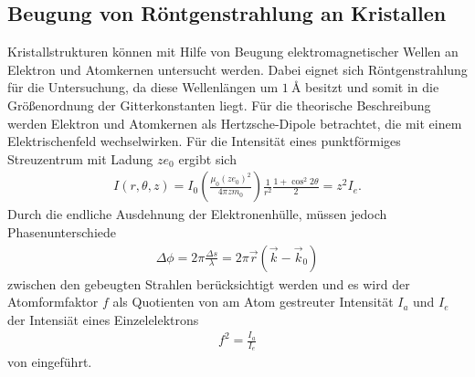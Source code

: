 \subsection{Beugung von Röntgenstrahlung an Kristallen}
\label{subsec:Beugung}
Kristallstrukturen können mit Hilfe von Beugung
elektromagnetischer Wellen an Elektron und Atomkernen untersucht werden.
Dabei eignet sich Röntgenstrahlung für die Untersuchung, da diese Wellenlängen um
$\SI{1}{\angstrom}$ besitzt und somit in
die Größenordnung der Gitterkonstanten liegt.
Für die theorische Beschreibung werden Elektron und Atomkernen
als Hertzsche-Dipole betrachtet, die mit einem
Elektrischenfeld wechselwirken.
Für die Intensität eines punktförmiges Streuzentrum mit
Ladung $ze_0$ ergibt sich
\begin{align}
  I(r,\theta,z) = I_0\left(\frac{\mu_0 (ze_0)^2}{4\pi zm_0}\right)\frac{1}{r^2}\frac{1+\cos^2 2\theta}{2}=z^2 I_e \label{6}.
\end{align}
Durch die endliche Ausdehnung der Elektronenhülle,
müssen jedoch Phasenunterschiede
\begin{align*}
  \Delta\phi=2\pi\frac{\Delta s}{\lambda}= 2\pi\vec{r}\left(\vec{k}-\vec{k}_0\right)
\end{align*}
zwischen den gebeugten
Strahlen berücksichtigt werden und es wird
der Atomformfaktor $f$ als Quotienten
von am Atom gestreuter Intensität $I_a$ und $I_e$ der
Intensiät eines Einzelelektrons
\begin{align}
f^2=\frac{I_a}{I_e}
\end{align}
von eingeführt.

